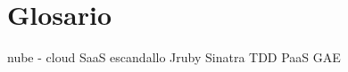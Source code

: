 \documentclass[a4paper,openright,14pt]{book}
\begin{document}
\chapter{Glosario}\label{cap.glossary}

nube - cloud
SaaS
escandallo
Jruby
Sinatra
TDD
PaaS
GAE
\end{document}
